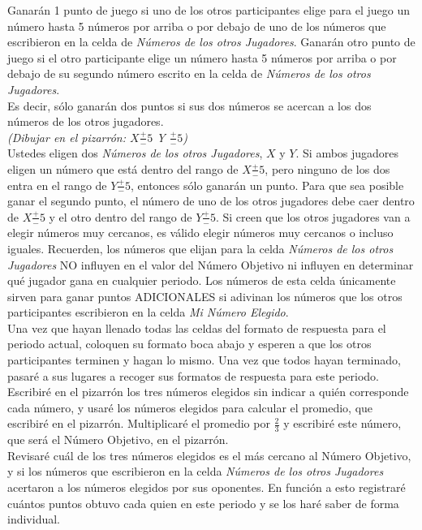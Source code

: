 Ganarán 1 punto de juego si uno de los otros participantes elige para el juego un número hasta 5 números por arriba o por debajo de uno de los números que escribieron en la celda de \textit{Números de los otros Jugadores}. Ganarán otro punto de juego si el otro participante elige un número hasta 5 números por arriba o por debajo de su segundo número escrito en la celda de \textit{Números de los otros Jugadores}.\\

Es decir, sólo ganarán dos puntos si sus dos números se acercan a los dos números de los otros jugadores.\\

\textit{(Dibujar en el pizarrón:		$X \frac{+}{-}5$			Y $\frac{+}{-}5$)}\\

Ustedes eligen dos \textit{Números de los otros Jugadores}, $X$ y $Y$. Si ambos jugadores eligen un número que está dentro del rango de $X \frac{+}{-}5$, pero ninguno de los dos entra en el rango de $Y\frac{+}{-}5$, entonces sólo ganarán un punto. Para que sea posible ganar el segundo punto, el número de uno de los otros jugadores debe caer dentro de $X\frac{+}{-}5$ y el otro dentro del rango de $Y\frac{+}{-}5$. Si creen que los otros jugadores van a elegir números muy cercanos, es válido elegir números muy cercanos o incluso iguales.
Recuerden, los números que elijan para la celda \textit{Números de los otros Jugadores} NO influyen en el valor del Número Objetivo ni influyen en determinar qué jugador gana en cualquier periodo. Los números de esta celda únicamente sirven para ganar puntos ADICIONALES si adivinan los números que los otros participantes escribieron en la celda \textit{Mi Número Elegido}.\\

Una vez que hayan llenado todas las celdas del formato de respuesta para el periodo actual, coloquen su formato boca abajo y esperen a que los otros participantes terminen y hagan lo mismo. Una vez que todos hayan terminado, pasaré a sus lugares a recoger sus formatos de respuesta para este periodo. Escribiré en el pizarrón los tres números elegidos sin indicar a quién corresponde cada número, y usaré los números elegidos para calcular el promedio, que escribiré en el pizarrón. Multiplicaré el promedio por $\frac{2}{3}$  y escribiré este número, que será el Número Objetivo, en el pizarrón.\\

Revisaré cuál de los tres números elegidos es el más cercano al Número Objetivo, y si los números que escribieron en la celda \textit{Números de los otros Jugadores} acertaron a los números elegidos por sus oponentes. En función a esto registraré cuántos puntos obtuvo cada quien en este periodo y se los haré saber de forma individual.\\

